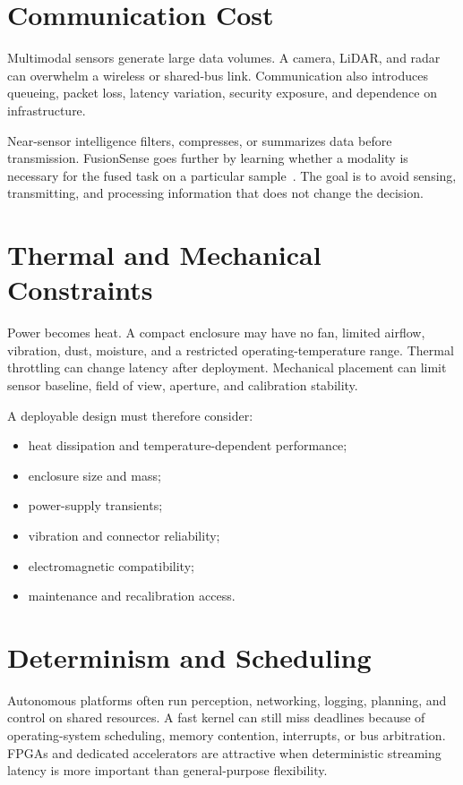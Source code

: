 \section{Communication Cost}

Multimodal sensors generate large data volumes. A camera, LiDAR, and radar can overwhelm a wireless or shared-bus link. Communication also introduces queueing, packet loss, latency variation, security exposure, and dependence on infrastructure.

Near-sensor intelligence filters, compresses, or summarizes data before transmission. FusionSense goes further by learning whether a modality is necessary for the fused task on a particular sample~\cite{yun2026fusionsense}. The goal is to avoid sensing, transmitting, and processing information that does not change the decision.

\section{Thermal and Mechanical Constraints}

Power becomes heat. A compact enclosure may have no fan, limited airflow, vibration, dust, moisture, and a restricted operating-temperature range. Thermal throttling can change latency after deployment. Mechanical placement can limit sensor baseline, field of view, aperture, and calibration stability.

A deployable design must therefore consider:

\begin{itemize}
    \item heat dissipation and temperature-dependent performance;
    \item enclosure size and mass;
    \item power-supply transients;
    \item vibration and connector reliability;
    \item electromagnetic compatibility;
    \item maintenance and recalibration access.
\end{itemize}

\section{Determinism and Scheduling}

Autonomous platforms often run perception, networking, logging, planning, and control on shared resources. A fast kernel can still miss deadlines because of operating-system scheduling, memory contention, interrupts, or bus arbitration. FPGAs and dedicated accelerators are attractive when deterministic streaming latency is more important than general-purpose flexibility.

